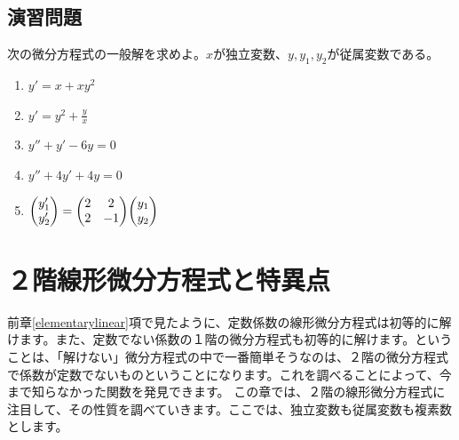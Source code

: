 \documentclass[report,paper=a4, fontsize=12pt, line_length=16cm, number_of_lines=33,dvipdfmx]{jlreq}
\numberwithin{equation}{section}
\begin{document}
\section{演習問題}\label{ex:ode}
次の微分方程式の一般解を求めよ。$x$が独立変数、$y,y_1,y_2$が従属変数である。
\begin{enumerate}
  \setlength{\itemsep}{10mm}
  \item \qquad $\displaystyle y'=x+xy^2$
  \item \qquad $\displaystyle y'=y^2+\frac{y}{x}$
  \item \qquad $\displaystyle y''+y'-6y=0$
  \item \qquad $\displaystyle y''+4y'+4y=0$
  \item \qquad $\displaystyle \mqty(y_1'\\ y_2')=\mqty(
    2 & 2 \\
    2 & -1
  )
    \mqty(y_1\\y_2)
  $
  
  \end{enumerate}
  


\chapter{２階線形微分方程式と特異点}
前章\ref{elementarylinear}項で見たように、定数係数の線形微分方程式は初等的に解けます。また、定数でない係数の１階の微分方程式も初等的に解けます。ということは、「解けない」微分方程式の中で一番簡単そうなのは、２階の微分方程式で係数が定数でないものということになります。これを調べることによって、今まで知らなかった関数を発見できます。
この章では、２階の線形微分方程式に注目して、その性質を調べていきます。ここでは、独立変数も従属変数も複素数とします。
\end{document}
